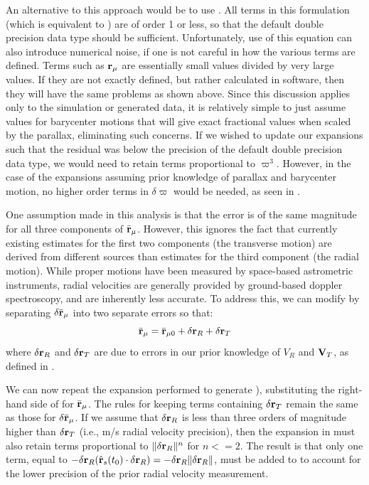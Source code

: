 An alternative to this approach would be to use .  All terms in this formulation (which is equivalent to ) are of order 1 or less, so that the default double precision data type should be sufficient.  Unfortunately, use of this equation can also introduce numerical noise, if one is not careful in how the various terms are defined.  Terms such as $\mathbf{r}_\mu$ are essentially small values divided by very large values.  If they are not exactly defined, but rather calculated in software, then they will have the same problems as shown above.  Since this discussion applies only to the simulation or generated data, it is relatively simple to just assume values for barycenter motions that will give exact fractional values when scaled by the parallax, eliminating such concerns.  If we wished to update our expansions such that the residual was below the precision of the default double precision data type, we would need to retain terms proportional to $\varpi^3$.  However, in the case of the expansions assuming prior knowledge of parallax and barycenter motion, no higher order terms in $\delta \varpi$ would be needed, as seen in .

One assumption made in this analysis is that the error is of the same magnitude for all three components of $\bar{\mathbf{r}}_{\mu}$.  However, this ignores the fact that currently existing estimates for the first two components (the transverse motion) are derived from different sources than estimates for the third component (the radial motion).  While proper motions have been measured by space-based astrometric instruments, radial velocities are generally provided by ground-based doppler spectroscopy, and are inherently less accurate.  To address this, we can modify  by separating $\delta\bar{\mathbf{r}}_\mu$ into two separate errors so that:
\begin{equation}\label{eq:rmu_redef}
\bar{\mathbf{r}}_{\mu} =  \bar{\mathbf{r}}_{\mu0}  +\delta\mathbf{r}_{R} + \delta\mathbf{r}_{T} 
\end{equation}
where $\delta\mathbf{r}_{R}$ and $\delta\mathbf{r}_{T}$ are due to errors in our prior knowledge of $V_R$ and $\mathbf V_T$, as defined in .

 We can now repeat the expansion performed to generate ), substituting the right-hand side of  for $\bar{\mathbf{r}}_{\mu}$. The rules for keeping terms containing $ \delta\mathbf{r}_{T}$ remain the same as those for $\delta\bar{\mathbf{r}}_\mu$.  If we assume that $\delta\mathbf{r}_{R}$ is less than three orders of magnitude higher than $\delta\mathbf{r}_{T}$ (i.e., m/s radial velocity precision), then the expansion in  must also retain terms proportional to  $\Vert \delta\mathbf{r}_{R} \Vert^n$ for $n <= 2$.  The result is that only one term, equal to $-\delta\mathbf{r}_{R}( \hat{\mathbf{r}}_s(t_0) \cdot  \delta\mathbf{r}_{R}) = -\delta\mathbf{r}_{R}\Vert\delta\mathbf{r}_R\Vert$, must be added to  to account for the lower precision of the prior radial velocity measurement.

